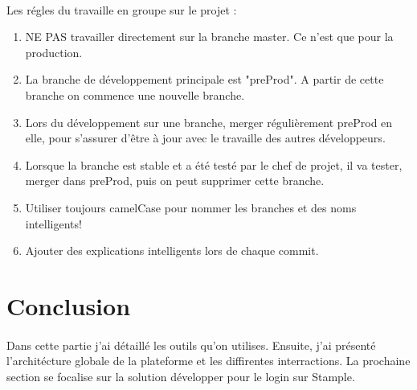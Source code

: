 \documentclass[11pt]{article} %
\begin{document}
\paragraph{}
Les régles du travaille en groupe sur le projet :
\begin{enumerate}
\item NE PAS travailler directement sur la branche master. Ce n'est que pour la production.
\item La branche de développement principale est "preProd". A partir de cette branche on commence une nouvelle branche. 
\item Lors du développement sur une branche, merger régulièrement preProd en elle, pour s'assurer d'être à jour avec le travaille des autres développeurs.
\item Lorsque la branche est stable et a été testé par le chef de projet, il va tester, merger dans preProd, puis on peut supprimer cette branche.
\item Utiliser toujours camelCase pour nommer les branches et des noms intelligents!
\item Ajouter des explications intelligents lors de chaque commit.

\end{enumerate}
\section{Conclusion}
\paragraph{}
Dans cette partie j'ai détaillé les outils qu'on utilises. Ensuite, j'ai présenté l'architécture globale de la plateforme et les diffirentes interractions. La prochaine section se focalise sur la solution développer pour le login sur Stample.
\end{document}
